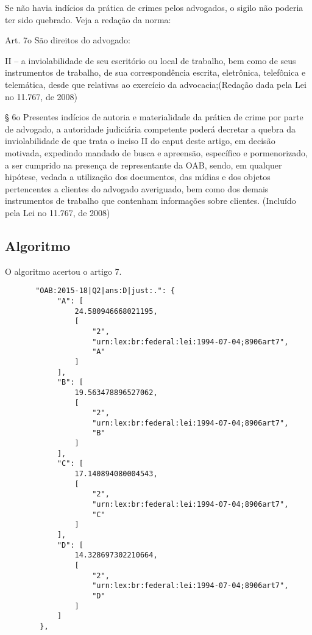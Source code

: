 \documentclass[12pt]{article}
\begin{document}
Se não havia indícios da prática de crimes pelos advogados, o sigilo não poderia ter sido quebrado. Veja a redação da norma:

Art. 7o São direitos do advogado:

II – a inviolabilidade de seu escritório ou local de trabalho, bem como de seus instrumentos de trabalho, de sua correspondência escrita, eletrônica, telefônica e telemática, desde que relativas ao exercício da advocacia;(Redação dada pela Lei no 11.767, de 2008)

§ 6o Presentes indícios de autoria e materialidade da prática de crime por parte de advogado, a autoridade judiciária competente poderá decretar a quebra da inviolabilidade de que trata o inciso II do caput deste artigo, em decisão motivada, expedindo mandado de busca e apreensão, específico e pormenorizado, a ser cumprido na presença de representante da OAB, sendo, em qualquer hipótese, vedada a utilização dos documentos, das mídias e dos objetos pertencentes a clientes do advogado averiguado, bem como dos demais instrumentos de trabalho que contenham informações sobre clientes. (Incluído pela Lei no 11.767, de 2008)

\subsection{Algoritmo}

O algoritmo acertou o artigo 7.

\begin{lstlisting}
       "OAB:2015-18|Q2|ans:D|just:.": {
            "A": [
                24.580946668021195,
                [
                    "2",
                    "urn:lex:br:federal:lei:1994-07-04;8906art7",
                    "A"
                ]
            ],
            "B": [
                19.563478896527062,
                [
                    "2",
                    "urn:lex:br:federal:lei:1994-07-04;8906art7",
                    "B"
                ]
            ],
            "C": [
                17.140894080004543,
                [
                    "2",
                    "urn:lex:br:federal:lei:1994-07-04;8906art7",
                    "C"
                ]
            ],
            "D": [
                14.328697302210664,
                [
                    "2",
                    "urn:lex:br:federal:lei:1994-07-04;8906art7",
                    "D"
                ]
            ]
        },

\end{lstlisting}
\end{document}
